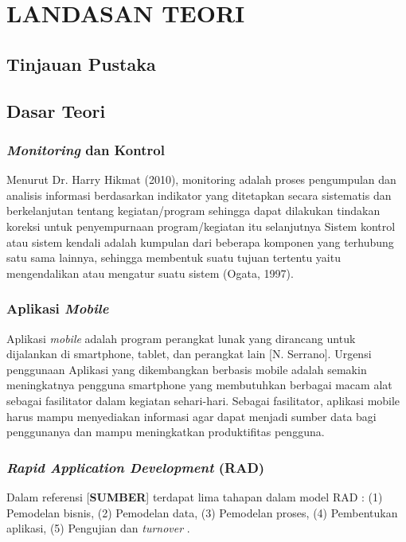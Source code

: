 \chapter{LANDASAN TEORI}

%
\vspace{4.5pt}

\begin{flushleft}
    \section{Tinjauan Pustaka}
    \section{Dasar Teori}
    \begin{justify}
        \subsection{\textit{Monitoring} dan Kontrol}
        Menurut Dr. Harry Hikmat (2010), monitoring adalah proses pengumpulan
dan analisis informasi berdasarkan indikator yang ditetapkan secara sistematis dan
berkelanjutan tentang kegiatan/program sehingga dapat dilakukan tindakan
koreksi untuk penyempurnaan program/kegiatan itu selanjutnya
Sistem kontrol atau
sistem kendali adalah kumpulan dari beberapa komponen yang terhubung satu
sama lainnya, sehingga membentuk suatu tujuan tertentu yaitu mengendalikan
atau mengatur suatu sistem (Ogata, 1997). 
\\

        \subsection{Aplikasi \textit{Mobile}}
        Aplikasi \textit{mobile} adalah program perangkat lunak yang dirancang untuk dijalankan di smartphone, tablet, dan perangkat lain [N. Serrano]. Urgensi penggunaan Aplikasi yang dikembangkan berbasis mobile adalah semakin meningkatnya pengguna smartphone yang membutuhkan berbagai macam alat sebagai fasilitator dalam kegiatan sehari-hari. Sebagai fasilitator, aplikasi mobile harus mampu menyediakan informasi agar dapat menjadi sumber data bagi penggunanya dan mampu meningkatkan produktifitas pengguna. 
        \\
        \subsection{\textit{Rapid Application Development} (RAD)}
        Dalam referensi [\textbf{SUMBER}] terdapat lima tahapan dalam model RAD : (1) Pemodelan bisnis, (2) Pemodelan data, (3) Pemodelan proses, (4) Pembentukan aplikasi, (5) Pengujian dan \textit{turnover} .
        

\end{justify}
\end{flushleft}
